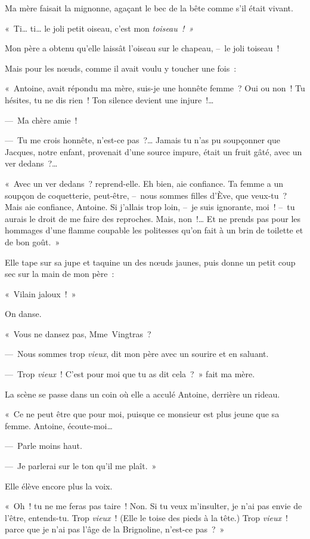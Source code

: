 \documentclass[french,twoside]{book} %
\begin{document}
Ma mère faisait la mignonne, agaçant le bec de la bête comme s’il était vivant.\par
« Ti… ti… le joli petit oiseau, c’est mon \emph{toiseau ! »}\par
Mon père a obtenu qu’elle laissât l’oiseau sur le chapeau, – le joli toiseau !\par
Mais pour les nœuds, comme il avait voulu y toucher une fois :\par
« Antoine, avait répondu ma mère, suis-je une honnête femme ? Oui ou non ! Tu hésites, tu ne dis rien ! Ton silence devient une injure !…\par
— Ma chère amie !\par
— Tu me crois honnête, n’est-ce pas ?… Jamais tu n’as pu soupçonner que Jacques, notre enfant, provenait d’une source impure, était un fruit gâté, avec un ver dedans ?…\par
« Avec un ver dedans ? reprend-elle. Eh bien, aie confiance. Ta femme a un soupçon de coquetterie, peut-être, – nous sommes filles d’Ève, que veux-tu ? Mais aie confiance, Antoine. Si j’allais trop loin, – je suis ignorante, moi ! – tu aurais le droit de me faire des reproches. Mais, non !… Et ne prends pas pour les hommages d’une flamme coupable les politesses qu’on fait à un brin de toilette et de bon goût. »\par
Elle tape sur sa jupe et taquine un des nœuds jaunes, puis donne un petit coup sec sur la main de mon père :\par
« Vilain jaloux ! »\par
\bigbreak
\noindent On danse.\par
« Vous ne dansez pas, Mme Vingtras ?\par
— Nous sommes trop \emph{vieux}, dit mon père avec un sourire et en saluant.\par
— Trop \emph{vieux} ! C’est pour moi que tu as dit cela ? » fait ma mère.\par
La scène se passe dans un coin où elle a acculé Antoine, derrière un rideau.\par
« Ce ne peut être que pour moi, puisque ce monsieur est plus jeune que sa femme. Antoine, écoute-moi…\par
— Parle moins haut.\par
— Je parlerai sur le ton qu’il me plaît. »\par
Elle élève encore plus la voix.\par
« Oh ! tu ne me feras pas taire ! Non. Si tu veux m’insulter, je n’ai pas envie de l’être, entends-tu. Trop \emph{vieux} ! (Elle le toise des pieds à la tête.) Trop \emph{vieux} ! parce que je n’ai pas l’âge de la Brignoline, n’est-ce pas ? »\par
\end{document}
